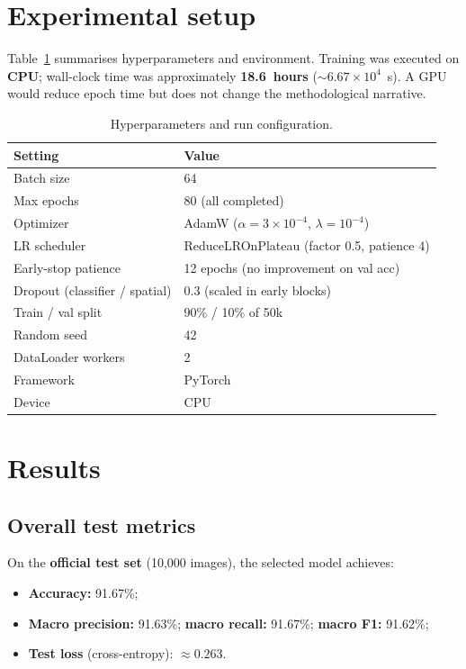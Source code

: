 \documentclass[11pt,a4paper]{article}
\begin{document}
\section{Experimental setup}
\label{sec:exp}

Table~\ref{tab:hyper} summarises hyperparameters and environment. Training was executed on \textbf{CPU}; wall-clock time was approximately \textbf{18.6~hours} ($\sim 6.67\times 10^4$~s). A GPU would reduce epoch time but does not change the methodological narrative.

\begin{table}[ht]
  \centering
  \caption{Hyperparameters and run configuration.}
  \label{tab:hyper}
  \begin{tabular}{@{}ll@{}}
    \toprule
    Setting & Value \\
    \midrule
    Batch size & 64 \\
    Max epochs & 80 (all completed) \\
    Optimizer & AdamW ($\alpha=3\times 10^{-4}$, $\lambda=10^{-4}$) \\
    LR scheduler & ReduceLROnPlateau (factor 0.5, patience 4) \\
    Early-stop patience & 12 epochs (no improvement on val acc) \\
    Dropout (classifier / spatial) & 0.3 (scaled in early blocks) \\
    Train / val split & 90\% / 10\% of 50k \\
    Random seed & 42 \\
    DataLoader workers & 2 \\
    Framework & PyTorch \\
    Device & CPU \\
    \bottomrule
  \end{tabular}
\end{table}

\section{Results}
\label{sec:results}

\subsection{Overall test metrics}
On the \textbf{official test set} (10{,}000 images), the selected model achieves:
\begin{itemize}[noitemsep]
  \item \textbf{Accuracy:} 91.67\%;
  \item \textbf{Macro precision:} 91.63\%; \textbf{macro recall:} 91.67\%; \textbf{macro F1:} 91.62\%;
  \item \textbf{Test loss} (cross-entropy): $\approx 0.263$.
\end{itemize}
\end{document}
